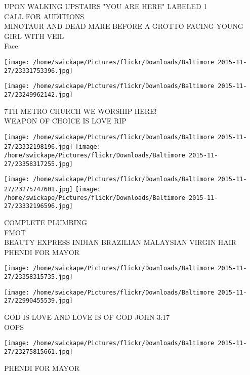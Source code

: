 \documentclass[10pt,letterpaper]{article}
\begin{document}
UPON WALKING UPSTAIRS "YOU ARE HERE" LABELED 1\\
CALL FOR AUDITIONS\\
MINOTAUR AND DEAD MARE BEFORE A GROTTO FACING YOUNG GIRL WITH VEIL\\
Face
\pagebreak

\texttt{[image: /home/swickape/Pictures/flickr/Downloads/Baltimore 2015-11-27/23331753396.jpg]}

\vspace{0.25in}
\texttt{[image: /home/swickape/Pictures/flickr/Downloads/Baltimore 2015-11-27/23249962142.jpg]}

7TH METRO CHURCH WE WORSHIP HERE!\\
WEAPON OF CHOICE IS LOVE RIP
\pagebreak

\texttt{[image: /home/swickape/Pictures/flickr/Downloads/Baltimore 2015-11-27/23332198196.jpg]}
\texttt{[image: /home/swickape/Pictures/flickr/Downloads/Baltimore 2015-11-27/23358317255.jpg]}

\texttt{[image: /home/swickape/Pictures/flickr/Downloads/Baltimore 2015-11-27/23275747601.jpg]}
\texttt{[image: /home/swickape/Pictures/flickr/Downloads/Baltimore 2015-11-27/23332196596.jpg]}

COMPLETE PLUMBING\\
FMOT\\
BEAUTY EXPRESS INDIAN BRAZILIAN MALAYSIAN VIRGIN HAIR\\
PHENDI FOR MAYOR
\pagebreak

\texttt{[image: /home/swickape/Pictures/flickr/Downloads/Baltimore 2015-11-27/23358315735.jpg]}

\vspace{0.25in}
\texttt{[image: /home/swickape/Pictures/flickr/Downloads/Baltimore 2015-11-27/22990455539.jpg]}

GOD IS LOVE AND LOVE IS OF GOD JOHN 3:17\\
OOPS
\pagebreak

\texttt{[image: /home/swickape/Pictures/flickr/Downloads/Baltimore 2015-11-27/23275815661.jpg]}

PHENDI FOR MAYOR
\pagebreak
\end{document}
